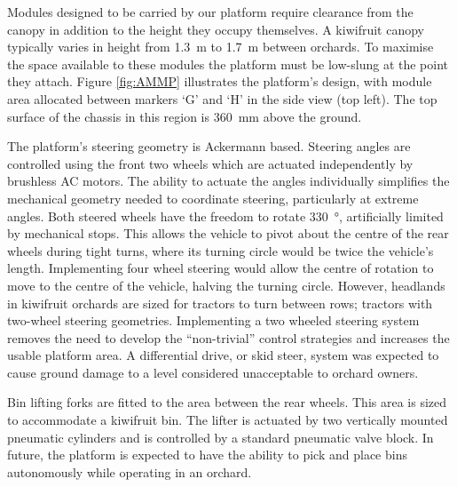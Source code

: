 \documentclass[preprint,authoryear,12pt]{elsarticle}
\begin{document}
        Modules designed to be carried by our platform require clearance from the canopy in addition to the height they occupy themselves.
        A kiwifruit canopy typically varies in height from \SI{1.3}{\meter} to \SI{1.7}{\meter} between orchards.
        To maximise the space available to these modules the platform must be low-slung at the point they attach.
        Figure \ref{fig:AMMP} illustrates the platform's design, with module area allocated between markers `G' and `H' in the side view (top left).
        The top surface of the chassis in this region is \SI{360}{\milli\meter} above the ground.

        The platform's steering geometry is Ackermann based.
        Steering angles are controlled using the front two wheels which are actuated independently by brushless AC motors.
        The ability to actuate the angles individually simplifies the mechanical geometry needed to coordinate steering, particularly at extreme angles.
        Both steered wheels have the freedom to rotate \SI{330}{\degree}, artificially limited by mechanical stops.
        This allows the vehicle to pivot about the centre of the rear wheels during tight turns, where its turning circle would be twice the vehicle's length.
        Implementing four wheel steering would allow the centre of rotation to move to the centre of the vehicle, halving the turning circle.
        However, headlands in kiwifruit orchards are sized for tractors to turn between rows; tractors with two-wheel steering geometries.
        Implementing a two wheeled steering system removes the need to develop the ``non-trivial'' control strategies and increases the usable platform area.
        A differential drive, or skid steer, system was expected to cause ground damage to a level considered unacceptable to orchard owners.

        Bin lifting forks are fitted to the area between the rear wheels.
        This area is sized to accommodate a kiwifruit bin.
        The lifter is actuated by two vertically mounted pneumatic cylinders and is controlled by a standard pneumatic valve block.
        In future, the platform is expected to have the ability to pick and place bins autonomously while operating in an orchard.
\end{document}
